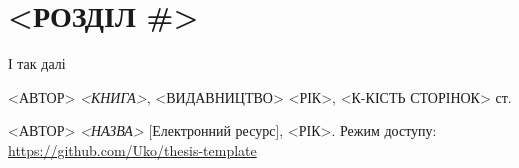 \documentclass[12pt,a4paper]{article}
\begin{document}
\clearpage

\section{<РОЗДІЛ \#>}

І так далі\cite{web}

\clearpage
{}
\begin{thebibliography}{9}

  <АВТОР> \emph{<КНИГА>},
    <ВИДАВНИЦТВО> <РІК>, <К-КІСТЬ СТОРІНОК> ст.
    
  <АВТОР> \emph{<НАЗВА>} [Електронний ресурс],
    <РІК>. Режим доступу:
    \url{https://github.com/Uko/thesis-template}

\end{thebibliography}
\end{document}
